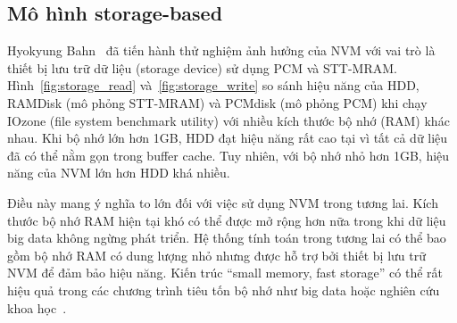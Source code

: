 \subsection{Mô hình storage-based}

Hyokyung Bahn~\cite{bahnImplicationsNVMBased2020} đã tiến hành thử nghiệm ảnh
hưởng của NVM với vai trò là thiết bị lưu trữ dữ liệu (storage device) sử dụng
PCM và STT-MRAM. Hình~\ref{fig:storage_read} và~\ref{fig:storage_write} so sánh
hiệu năng của HDD, RAMDisk (mô phỏng STT-MRAM) và PCMdisk (mô phỏng PCM) khi
chạy IOzone (file system benchmark utility) với nhiều kích thước bộ nhớ (RAM)
khác nhau. Khi bộ nhớ lớn hơn 1GB, HDD đạt hiệu năng rất cao tại vì tất cả dữ
liệu đã có thể nằm gọn trong buffer cache. Tuy nhiên, với bộ nhớ nhỏ hơn 1GB,
hiệu năng của NVM lớn hơn HDD khá nhiều.



Điều này mang ý nghĩa to lớn đối với việc sử dụng NVM trong tương lai. Kích
thước bộ nhớ RAM hiện tại khó có thể được mở rộng hơn nữa trong khi dữ liệu big
data không ngừng phát triển. Hệ thống tính toán trong tương lai có thể bao gồm
bộ nhớ RAM có dung lượng nhỏ nhưng được hỗ trợ bởi thiết bị lưu trữ NVM để đảm
bảo hiệu năng. Kiến trúc ``small memory, fast storage'' có thể rất hiệu quả
trong các chương trình tiêu tốn bộ nhớ như big data hoặc nghiên cứu khoa
học~\cite{bahnImplicationsNVMBased2020}.


